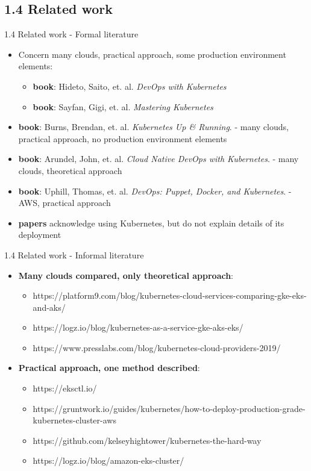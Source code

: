 \documentclass{beamer}
\begin{document}
\subsection{1.4 Related work}
\begin{frame}{1.4 Related work - Formal literature}%
\begin{itemize}
	\item Concern many clouds, practical approach, some production environment elements:
	\begin{itemize}
		\item \textbf{book}: Hideto, Saito, et. al. \textit{DevOps with Kubernetes}
		\item \textbf{book}: Sayfan, Gigi, et. al. \textit{Mastering Kubernetes}
	\end{itemize}
	\item \textbf{book}: Burns, Brendan, et. al. \textit{Kubernetes Up \& Running}. - many clouds, practical approach, no production environment elements
	\item \textbf{book}: Arundel, John, et. al. \textit{Cloud Native DevOps with Kubernetes}. - many clouds, theoretical approach
	\item \textbf{book}: Uphill, Thomas, et. al. \textit{DevOps: Puppet, Docker, and Kubernetes}. - AWS, practical approach
	\item \textbf{papers} acknowledge using Kubernetes, but do not explain details of its deployment
\end{itemize}
\end{frame}

\begin{frame}{1.4 Related work - Informal literature}%
\begin{itemize}
	\item \textbf{Many clouds compared, only theoretical approach}:
	\begin{itemize}
		\item https://platform9.com/blog/kubernetes-cloud-services-comparing-gke-eks-and-aks/
		\item https://logz.io/blog/kubernetes-as-a-service-gke-aks-eks/
		\item https://www.presslabs.com/blog/kubernetes-cloud-providers-2019/
	\end{itemize}
	\item \textbf{Practical approach, one method described}:
	\begin{itemize}
		\item https://eksctl.io/
		\item https://gruntwork.io/guides/kubernetes/how-to-deploy-production-grade-kubernetes-cluster-aws
		\item https://github.com/kelseyhightower/kubernetes-the-hard-way
		\item https://logz.io/blog/amazon-eks-cluster/
	\end{itemize}
\end{itemize}
\end{frame}
\end{document}
